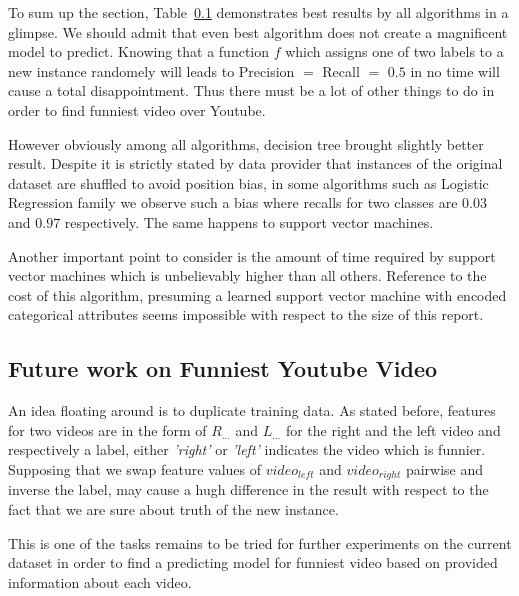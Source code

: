 To sum up the section, Table~\ref{} demonstrates best results by all algorithms
in a glimpse. We should admit that even best algorithm does not create a
magnificent model to predict. Knowing that a function $f$ which assigns one of
two labels to a new instance randomely will leads to Precision $=$ Recall $=$
$0.5$ in no time will cause a total disappointment. Thus there must be a lot of
other things to do in order to find funniest video over Youtube. 

However
obviously among all algorithms, decision tree brought slightly better result.
Despite it is strictly stated by data provider that instances of the original
dataset are shuffled to avoid position bias, in some algorithms such as Logistic
Regression family we observe such a bias where recalls for two classes are
$0.03$ and $0.97$ respectively. The same happens to support vector machines.

Another important point to consider is the amount of time required by support
vector machines which is unbelievably higher than all others. Reference to the
cost of this algorithm, presuming a learned support vector machine with encoded
categorical attributes seems impossible with respect to the size of this report.

\subsection{Future work on Funniest Youtube Video}

An idea floating around is to duplicate training data. As stated before,
features for two videos are in the form of $R_{\ldots}$ and $L_{\ldots}$ for the
right and the left video and respectively a label, either {\it 'right'} or
{\it'left'} indicates the video which is funnier. Supposing that we swap
feature values of $video_{left}$ and $video_{right}$ pairwise and inverse the
label, may cause a hugh difference in the result with respect to the fact that
we are sure about truth of the new instance.

This is one of the tasks remains to be tried for further experiments on the
current dataset in order to find a predicting model for funniest video based on
provided information about each video.

